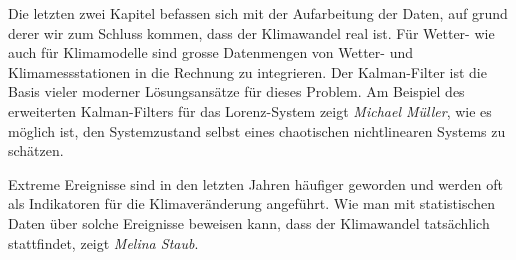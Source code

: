 Die letzten zwei Kapitel befassen sich mit der Aufarbeitung der
Daten, auf grund derer wir zum Schluss kommen, dass 
der Klimawandel real ist.
Für Wetter- wie auch für Klimamodelle sind grosse Datenmengen
von Wetter- und Klimamessstationen in die Rechnung zu integrieren.
Der Kalman-Filter ist die Basis vieler moderner Lösungsansätze
für dieses Problem.
Am Beispiel des erweiterten Kalman-Filters für das Lorenz-System
zeigt {\em Michael Müller}, wie es möglich ist, den Systemzustand
selbst eines chaotischen nichtlinearen Systems zu schätzen.

Extreme Ereignisse sind in den letzten Jahren häufiger geworden
und werden oft als Indikatoren für die Klimaveränderung angeführt.
Wie man mit statistischen Daten über solche Ereignisse beweisen
kann, dass der Klimawandel tatsächlich stattfindet, zeigt
{\em Melina Staub}.






